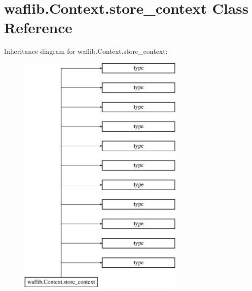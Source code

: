 \hypertarget{classwaflib_1_1_context_1_1store__context}{}\section{waflib.\+Context.\+store\+\_\+context Class Reference}
\label{classwaflib_1_1_context_1_1store__context}
Inheritance diagram for waflib.\+Context.\+store\+\_\+context\+:\begin{figure}[H]
\begin{center}
\leavevmode
\includegraphics[height=12.000000cm]{classwaflib_1_1_context_1_1store__context}
\end{center}
\end{figure}
